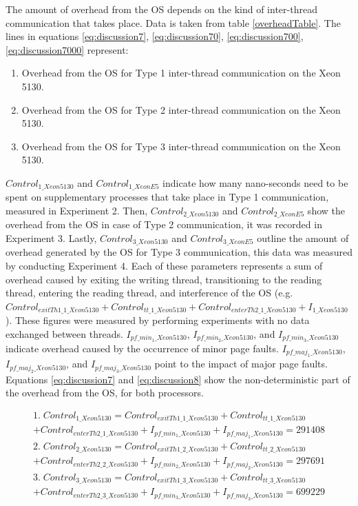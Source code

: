 The amount of overhead from the OS depends on the kind of inter-thread communication that takes place. Data is taken from table \ref{overheadTable}. The lines in equations \ref{eq:discussion7}, \ref{eq:discussion70}, \ref{eq:discussion700}, \ref{eq:discussion7000} represent:

\begin{enumerate}
  \item Overhead from the OS for Type 1 inter-thread communication on the Xeon 5130.
  \item Overhead from the OS for Type 2 inter-thread communication on the Xeon 5130.
  \item Overhead from the OS for Type 3 inter-thread communication on the Xeon 5130.
\end{enumerate}

$Control_{1\_Xeon5130}$ and $Control_{1\_XeonE5}$ indicate how many nano-seconds need to be spent on supplementary processes that take place in Type 1 communication, measured in Experiment 2. Then, $Control_{2\_Xeon5130}$ and $Control_{2\_XeonE5}$ show the overhead from the OS in case of Type 2 communication, it was recorded in Experiment 3. Lastly, $Control_{3\_Xeon5130}$ and $Control_{3\_XeonE5}$ outline the amount of overhead generated by the OS for Type 3 communication, this data was measured by conducting Experiment 4. Each of these parameters represents a sum of overhead caused by exiting the writing thread, transitioning to the reading thread, entering the reading thread, and interference of the OS (e.g. $Control_{exitTh1\_1\_Xeon5130} + Control_{tt\_1\_Xeon5130} + Control_{enterTh2\_1\_Xeon5130} + I_{1\_Xeon5130}$). These figures were measured by performing experiments with no data exchanged between threads. $I_{pf\_min_1\_Xeon5130}$, $I_{pf\_min_2\_Xeon5130}$, and $I_{pf\_min_3\_Xeon5130}$ indicate overhead caused by the occurrence of minor page faults. $I_{pf\_maj_1\_Xeon5130}$, $I_{pf\_maj_2\_Xeon5130}$, and $I_{pf\_maj_3\_Xeon5130}$ point to the impact of major page faults. Equations \ref{eq:discussion7} and \ref{eq:discussion8} show the non-deterministic part of the overhead from the OS, for both processors.

\begin{equation}\label{eq:discussion7}
\begin{split}
1.\; Control_{1\_Xeon5130} = Control_{exitTh1\_1\_Xeon5130} + Control_{tt\_1\_Xeon5130} \\ + Control_{enterTh2\_1\_Xeon5130} + I_{pf\_min_1\_Xeon5130} + I_{pf\_maj_1\_Xeon5130}  = 291408 \\
2.\; Control_{2\_Xeon5130} = Control_{exitTh1\_2\_Xeon5130} + Control_{tt\_2\_Xeon5130} \\ + Control_{enterTh2\_2\_Xeon5130} + I_{pf\_min_2\_Xeon5130} + I_{pf\_maj_2\_Xeon5130}= 297691 \\
3.\; Control_{3\_Xeon5130} = Control_{exitTh1\_3\_Xeon5130} + Control_{tt\_3\_Xeon5130} \\ + Control_{enterTh2\_3\_Xeon5130} + I_{pf\_min_3\_Xeon5130} + I_{pf\_maj_3\_Xeon5130} = 699229 \\
\end{split}
\end{equation}

